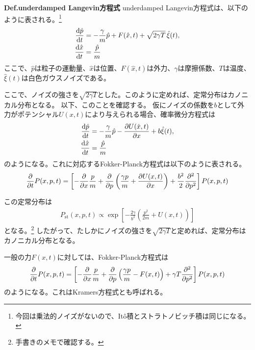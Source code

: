 \documentclass[a4paper,11pt]{jsarticle}
\numberwithin{equation}{section}
\begin{document}
\begin{itembox}[l]{\textbf{Def.underdamped Langevin方程式}}
    underdamped Langevin方程式は、以下のように表される。\footnote{今回は乗法的ノイズがないので、Itô積とストラトノビッチ積は同じになる。}
\begin{align}
    \dv{\hat{p}}{t} &= -\frac{\gamma}{m} \hat{p} + F(\hat{x}, t) + \sqrt{2\gamma T} \, \hat{\xi}(t), \label{eq:underdamped_langevin} \\
    \dv{\hat{x}}{t} &= \frac{\hat{p}}{m} 
\end{align}
ここで、$\hat{p}$は粒子の運動量、$\hat{x}$は位置、$F(\hat{x},t)$は外力、$\gamma$は摩擦係数、$T$は温度、$\hat{\xi}(t)$は白色ガウスノイズである。
\end{itembox}
ここで、ノイズの強さを$\sqrt{2\gamma T}$とした。このように定めれば、定常分布はカノニカル分布となる。
以下、このことを確認する。
仮にノイズの係数を$b$として外力がポテンシャル$U(x,t)$により与えられる場合、確率微分方程式は
\begin{align}
\dv{\hat{p}}{t} &= -\frac{\gamma}{m} \hat{p} - \pdv{U(\hat{x}, t)}{x} + b \hat{\xi}(t), \\
\dv{\hat{x}}{t} &= \frac{\hat{p}}{m}
\end{align}
のようになる。これに対応するFokker-Planck方程式は以下のように表される。
\begin{align}
\pdv{t} P(x, p, t) 
= \left[
    - \pdv{x} \frac{p}{m} 
    + \pdv{p} \left( \frac{\gamma p}{m} + \pdv{U(x,t)}{x} \right) 
    + \frac{b^2}{2} \pdv[2]{p}
\right] P(x, p, t)
\end{align}

この定常分布は
\begin{align}
P_{\text{st}}(x, p, t) \propto \exp \left[ -\frac{2\gamma}{b^2} \left( \frac{p^2}{2m} + U(x, t) \right) \right]
\end{align}
となる。\footnote{手書きのメモで確認する。}
したがって、たしかにノイズの強さを$\sqrt{2\gamma T}$と定めれば、定常分布はカノニカル分布となる。

一般の力$F(x,t)$に対しては、Fokker-Planck方程式は
\begin{align}
\pdv{t} P(x, p, t) 
= \left[
    - \pdv{x} \frac{p}{m} 
    + \pdv{p} \left( \frac{\gamma p}{m} - F(x, t) \right) 
    + \gamma T \pdv[2]{p}
\right] P(x, p, t)
\end{align}
のようになる。これはKramers方程式とも呼ばれる。\\
\end{document}
